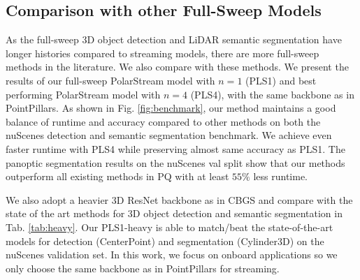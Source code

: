 \documentclass{article}
\begin{document}
\subsection{Comparison with other Full-Sweep Models}
As the full-sweep 3D object detection and LiDAR semantic segmentation have longer histories compared to streaming models, there are more full-sweep methods in the literature. We also compare with these methods. We present the results of our full-sweep PolarStream model with $n=1$ (PLS1) and best performing PolarStream model with $n=4$ (PLS4), with the same backbone as in PointPillars\cite{lang2019pointpillars}.  As shown in Fig. \ref{fig:benchmark}, our method maintains a good balance of runtime and accuracy compared to other methods on both the nuScenes detection and semantic segmentation benchmark. We achieve even faster runtime with PLS4 while preserving almost same accuracy as PLS1. The panoptic segmentation results on the nuScenes val split show that our methods outperform all existing methods in PQ with at least $55\%$ less runtime. 

We also adopt a heavier 3D ResNet\cite{he2016deep} backbone as in CBGS\cite{zhu2019class} and compare with the state of the art methods for 3D object detection and semantic segmentation in Tab. \ref{tab:heavy}. Our PLS1-heavy is able to match/beat the state-of-the-art models for detection (CenterPoint\cite{yin2020center}) and segmentation (Cylinder3D\cite{zhou2020cylinder3d}) on the nuScenes validation set. In this work, we focus on onboard applications so we only choose the same backbone as in PointPillars\cite{lang2019pointpillars} for streaming.

\begin{table}
  \centering
  \renewcommand{\arraystretch}{1.2}
  \caption{Comparison with state-of-the-art methods on nuScenes Val split.}\label{tab:heavy}
\end{table}
\end{document}

